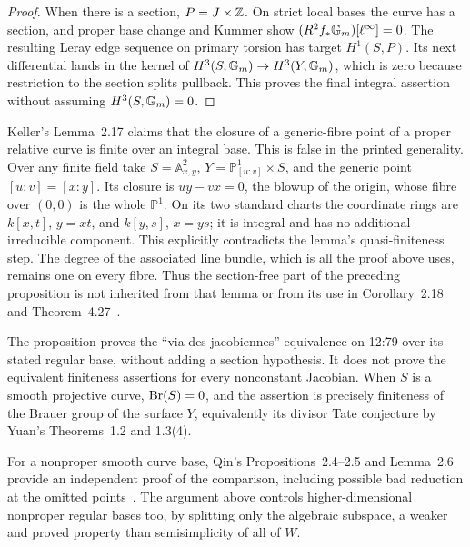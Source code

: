 \begin{proof}
When there is a section, \(P=J\times\mathbb Z\).  On strict local
bases the curve has a section, and proper base change and Kummer
show \((R^2f_*{\mathbb G_m})[\ell^\infty]=0\).  The resulting
Leray edge sequence on primary torsion has target
\(H^1(S,P)\).  Its next differential lands in the kernel of
\(H^3(S,{\mathbb G_m})\to H^3(Y,{\mathbb G_m})\), which is zero because
restriction to the section splits pullback.  This proves the final
integral assertion without assuming \(H^3(S,{\mathbb G_m})=0\).
\end{proof}

\begin{remark}\label{rem:B-Keller-closure-error}
Keller's Lemma~2.17 claims that the closure of a generic-fibre point
of a proper relative curve is finite over an integral base.  This
is false in the printed generality.  Over any finite field take
\(S=\mathbb A^2_{x,y}\), \(Y=\mathbb P^1_{[u:v]}\times S\),
and the generic point \([u:v]=[x:y]\).  Its closure is
\(uy-vx=0\), the blowup of the origin, whose fibre over
\((0,0)\) is the whole \(\mathbb P^1\).  On its two standard
charts the coordinate rings are \(k[x,t]\), \(y=xt\), and
\(k[y,s]\), \(x=ys\); it is integral and has no additional
irreducible component.  This explicitly contradicts the lemma's
quasi-finiteness step.  The degree of the associated line bundle,
which is all the proof above uses, remains one on every fibre.
Thus the section-free part of the preceding proposition is not
inherited from that lemma or from its use in Corollary~2.18 and
Theorem~4.27~\cite[Lemma~2.17]{BKeller2016}.
\end{remark}

The proposition proves the ``via des jacobiennes'' equivalence on
12:79 over its stated regular base, without adding a section
hypothesis.  It does not prove the equivalent finiteness assertions
for every nonconstant Jacobian.  When \(S\) is a smooth projective
curve, \(\operatorname{Br}(S)=0\), and the assertion is precisely finiteness
of the Brauer group of the surface \(Y\), equivalently its divisor
Tate conjecture by Yuan's Theorems~1.2 and 1.3(4).

For a nonproper smooth curve base, Qin's Propositions~2.4--2.5 and
Lemma~2.6 provide an independent proof of the comparison, including
possible bad reduction at the omitted points~\cite{BQin2024}.
The argument above controls higher-dimensional nonproper regular
bases too, by splitting only the algebraic subspace, a weaker and
proved property than semisimplicity of all of \(W\).


